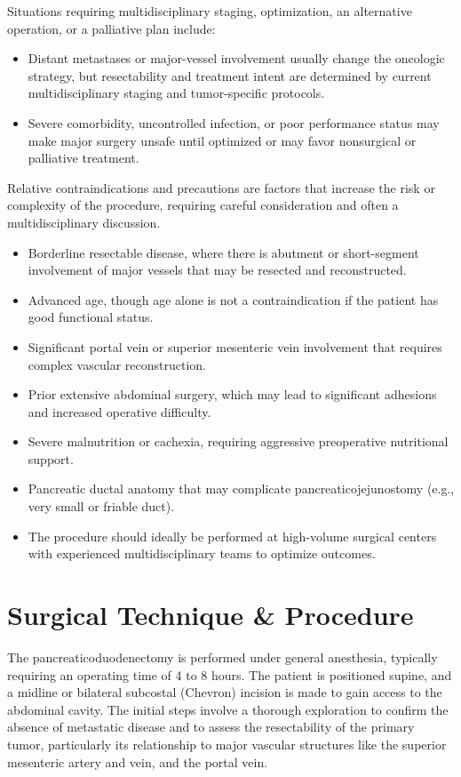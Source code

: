 Situations requiring multidisciplinary staging, optimization, an alternative operation, or a palliative plan include:

\begin{itemize}
  \item Distant metastases or major-vessel involvement usually change the oncologic strategy, but resectability and treatment intent are determined by current multidisciplinary staging and tumor-specific protocols.
  \item Severe comorbidity, uncontrolled infection, or poor performance status may make major surgery unsafe until optimized or may favor nonsurgical or palliative treatment.
\end{itemize}

Relative contraindications and precautions are factors that increase the risk or complexity of the procedure, requiring careful consideration and often a multidisciplinary discussion.

\begin{itemize}
  \item Borderline resectable disease, where there is abutment or short-segment involvement of major vessels that may be resected and reconstructed.
  \item Advanced age, though age alone is not a contraindication if the patient has good functional status.
  \item Significant portal vein or superior mesenteric vein involvement that requires complex vascular reconstruction.
  \item Prior extensive abdominal surgery, which may lead to significant adhesions and increased operative difficulty.
  \item Severe malnutrition or cachexia, requiring aggressive preoperative nutritional support.
  \item Pancreatic ductal anatomy that may complicate pancreaticojejunostomy (e.g., very small or friable duct).
  \item The procedure should ideally be performed at high-volume surgical centers with experienced multidisciplinary teams to optimize outcomes.
\end{itemize}

\section*{Surgical Technique \& Procedure}
The pancreaticoduodenectomy is performed under general anesthesia, typically requiring an operating time of 4 to 8 hours. The patient is positioned supine, and a midline or bilateral subcostal (Chevron) incision is made to gain access to the abdominal cavity. The initial steps involve a thorough exploration to confirm the absence of metastatic disease and to assess the resectability of the primary tumor, particularly its relationship to major vascular structures like the superior mesenteric artery and vein, and the portal vein.


